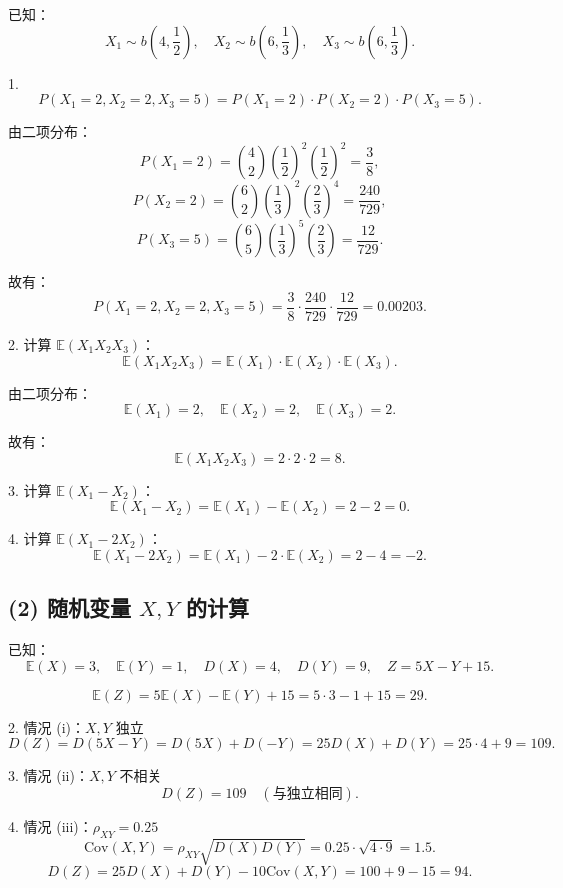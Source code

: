 \documentclass[twoside]{article}
\begin{document}
\begin{ans}{26}{26}

    已知：
    \[
    X_1 \sim b\left(4, \frac{1}{2}\right), \quad X_2 \sim b\left(6, \frac{1}{3}\right), \quad X_3 \sim b\left(6, \frac{1}{3}\right).
    \]
    
    1. 
    \[
    P(X_1 = 2, X_2 = 2, X_3 = 5) = P(X_1 = 2) \cdot P(X_2 = 2) \cdot P(X_3 = 5).
    \]
    
    由二项分布：
    \[
    P(X_1 = 2) = \binom{4}{2} \left(\frac{1}{2}\right)^2 \left(\frac{1}{2}\right)^2 = \frac{3}{8},
    \]
    \[
    P(X_2 = 2) = \binom{6}{2} \left(\frac{1}{3}\right)^2 \left(\frac{2}{3}\right)^4 = \frac{240}{729},
    \]
    \[
    P(X_3 = 5) = \binom{6}{5} \left(\frac{1}{3}\right)^5 \left(\frac{2}{3}\right) = \frac{12}{729}.
    \]
    
    故有：
    \[
    P(X_1 = 2, X_2 = 2, X_3 = 5) = \frac{3}{8} \cdot \frac{240}{729} \cdot \frac{12}{729} = 0.00203.
    \]
    
    2. 计算 \( \mathbb{E}(X_1 X_2 X_3) \)：
    \[
    \mathbb{E}(X_1 X_2 X_3) = \mathbb{E}(X_1) \cdot \mathbb{E}(X_2) \cdot \mathbb{E}(X_3).
    \]
    
    由二项分布：
    \[
    \mathbb{E}(X_1) = 2, \quad \mathbb{E}(X_2) = 2, \quad \mathbb{E}(X_3) = 2.
    \]
    
    故有：
    \[
    \mathbb{E}(X_1 X_2 X_3) = 2 \cdot 2 \cdot 2 = 8.
    \]
    
    3. 计算 \( \mathbb{E}(X_1 - X_2) \)：
    \[
    \mathbb{E}(X_1 - X_2) = \mathbb{E}(X_1) - \mathbb{E}(X_2) = 2 - 2 = 0.
    \]
    
    4. 计算 \( \mathbb{E}(X_1 - 2X_2) \)：
    \[
    \mathbb{E}(X_1 - 2X_2) = \mathbb{E}(X_1) - 2 \cdot \mathbb{E}(X_2) = 2 - 4 = -2.
    \]
    
    \subsection*{(2) 随机变量 \( X, Y \) 的计算}
    
    已知：
    \[
    \mathbb{E}(X) = 3, \quad \mathbb{E}(Y) = 1, \quad D(X) = 4, \quad D(Y) = 9, \quad Z = 5X - Y + 15.
    \]
    
    \[
    \mathbb{E}(Z) = 5 \mathbb{E}(X) - \mathbb{E}(Y) + 15 = 5 \cdot 3 - 1 + 15 = 29.
    \]
    
    2. 情况 (i)：\( X, Y \) 独立
    \[
    D(Z) = D(5X - Y) = D(5X) + D(-Y) = 25D(X) + D(Y) = 25 \cdot 4 + 9 = 109.
    \]
    
    3. 情况 (ii)：\( X, Y \) 不相关
    \[
    D(Z) = 109 \quad (\text{与独立相同}).
    \]
    
    4. 情况 (iii)：\( \rho_{XY} = 0.25 \)
    \[
    \text{Cov}(X, Y) = \rho_{XY} \sqrt{D(X) D(Y)} = 0.25 \cdot \sqrt{4 \cdot 9} = 1.5.
    \]
    \[
    D(Z) = 25D(X) + D(Y) - 10 \text{Cov}(X, Y) = 100 + 9 - 15 = 94.
    \]
\end{ans}
\end{document}
